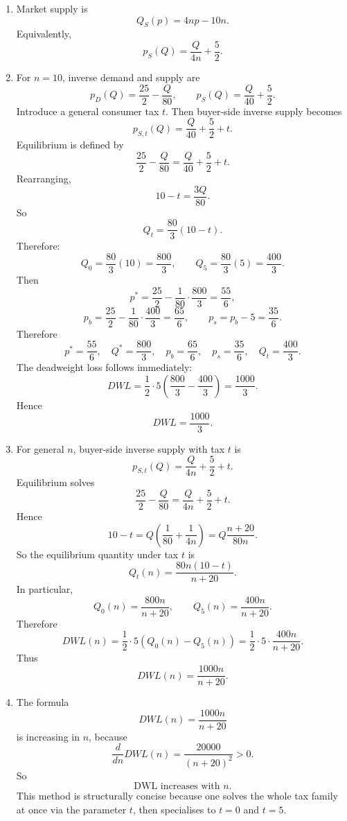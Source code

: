 \documentclass[12pt]{article}
\begin{document}
\begin{enumerate}[label=(\alph*)]
    \item
    Market supply is
    \[
    \boxed{Q_S(p)=4np-10n.}
    \]
    Equivalently,
    \[
    \boxed{p_S(Q)=\frac{Q}{4n}+\frac52.}
    \]

    \item
    For \(n=10\), inverse demand and supply are
    \[
    p_D(Q)=\frac{25}{2}-\frac{Q}{80},
    \qquad
    p_S(Q)=\frac{Q}{40}+\frac52.
    \]
    Introduce a general consumer tax \(t\). Then buyer-side inverse supply becomes
    \[
    p_{S,t}(Q)=\frac{Q}{40}+\frac52+t.
    \]
    Equilibrium is defined by
    \[
    \frac{25}{2}-\frac{Q}{80}=\frac{Q}{40}+\frac52+t.
    \]
    Rearranging,
    \[
    10-t=\frac{3Q}{80}.
    \]
    So
    \[
    Q_t=\frac{80}{3}(10-t).
    \]
    Therefore:
    \[
    Q_0=\frac{80}{3}(10)=\frac{800}{3},
    \qquad
    Q_5=\frac{80}{3}(5)=\frac{400}{3}.
    \]
    Then
    \[
    p^*=\frac{25}{2}-\frac{1}{80}\cdot \frac{800}{3}=\frac{55}{6},
    \]
    \[
    p_b=\frac{25}{2}-\frac{1}{80}\cdot \frac{400}{3}=\frac{65}{6},
    \qquad
    p_s=p_b-5=\frac{35}{6}.
    \]
    Therefore
    \[
    \boxed{p^*=\frac{55}{6},\quad Q^*=\frac{800}{3},\quad p_b=\frac{65}{6},\quad p_s=\frac{35}{6},\quad Q_t=\frac{400}{3}.}
    \]
    The deadweight loss follows immediately:
    \[
    DWL=\frac12\cdot 5\left(\frac{800}{3}-\frac{400}{3}\right)=\frac{1000}{3}.
    \]
    Hence
    \[
    \boxed{DWL=\frac{1000}{3}.}
    \]

    \item
    For general \(n\), buyer-side inverse supply with tax \(t\) is
    \[
    p_{S,t}(Q)=\frac{Q}{4n}+\frac52+t.
    \]
    Equilibrium solves
    \[
    \frac{25}{2}-\frac{Q}{80}=\frac{Q}{4n}+\frac52+t.
    \]
    Hence
    \[
    10-t=Q\left(\frac{1}{80}+\frac{1}{4n}\right)
    =Q\frac{n+20}{80n}.
    \]
    So the equilibrium quantity under tax \(t\) is
    \[
    \boxed{Q_t(n)=\frac{80n(10-t)}{n+20}.}
    \]
    In particular,
    \[
    Q_0(n)=\frac{800n}{n+20},
    \qquad
    Q_5(n)=\frac{400n}{n+20}.
    \]
    Therefore
    \[
    DWL(n)=\frac12\cdot 5\left(Q_0(n)-Q_5(n)\right)
    =\frac12\cdot 5\cdot \frac{400n}{n+20}.
    \]
    Thus
    \[
    \boxed{DWL(n)=\frac{1000n}{n+20}.}
    \]

    \item
    The formula
    \[
    DWL(n)=\frac{1000n}{n+20}
    \]
    is increasing in \(n\), because
    \[
    \frac{d}{dn}DWL(n)=\frac{20000}{(n+20)^2}>0.
    \]
    So
    \[
    \boxed{\text{DWL increases with }n.}
    \]
    This method is structurally concise because one solves the whole tax family at once via the parameter \(t\), then specialises to \(t=0\) and \(t=5\).
\end{enumerate}
\end{document}
